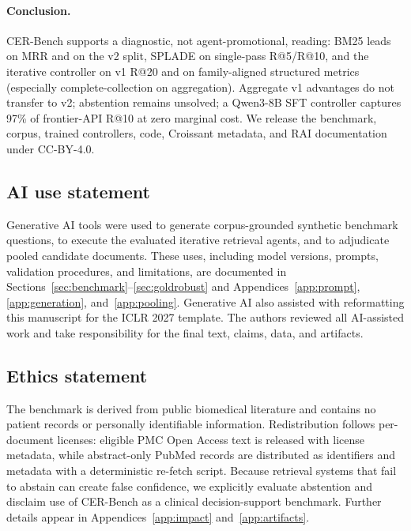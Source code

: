 \documentclass{article}
\begin{document}
\paragraph{Conclusion.} CER-Bench supports a diagnostic, not agent-promotional, reading: BM25 leads on MRR and on the v2 split, SPLADE on single-pass R@5/R@10, and the iterative controller on v1 R@20 and on family-aligned structured metrics (especially complete-collection on aggregation). Aggregate v1 advantages do not transfer to v2; abstention remains unsolved; a Qwen3-8B SFT controller captures 97\% of frontier-API R@10 at zero marginal cost. We release the benchmark, corpus, trained controllers, code, Croissant metadata, and RAI documentation under CC-BY-4.0.


\subsection*{AI use statement}
Generative AI tools were used to generate corpus-grounded synthetic benchmark questions, to execute the evaluated iterative retrieval agents, and to adjudicate pooled candidate documents. These uses, including model versions, prompts, validation procedures, and limitations, are documented in Sections~\ref{sec:benchmark}--\ref{sec:goldrobust} and Appendices~\ref{app:prompt}, \ref{app:generation}, and~\ref{app:pooling}. Generative AI also assisted with reformatting this manuscript for the ICLR 2027 template. The authors reviewed all AI-assisted work and take responsibility for the final text, claims, data, and artifacts.

\subsection*{Ethics statement}
The benchmark is derived from public biomedical literature and contains no patient records or personally identifiable information. Redistribution follows per-document licenses: eligible PMC Open Access text is released with license metadata, while abstract-only PubMed records are distributed as identifiers and metadata with a deterministic re-fetch script. Because retrieval systems that fail to abstain can create false confidence, we explicitly evaluate abstention and disclaim use of CER-Bench as a clinical decision-support benchmark. Further details appear in Appendices~\ref{app:impact} and~\ref{app:artifacts}.
\end{document}

